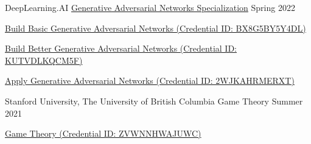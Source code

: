 

\begin{cventries}

  \cventry
    {DeepLearning.AI} %
    {\href{https://www.coursera.org/account/accomplishments/specialization/certificate/WT5VCNDDCB7V}{Generative Adversarial Networks Specialization}} %
    {} %
    {Spring 2022} %
    {
      \begin{cvitems} %
      	\item {\href{https://www.coursera.org/account/accomplishments/certificate/BX8G5BY5Y4DL}{Build Basic Generative Adversarial Networks (Credential ID: BX8G5BY5Y4DL)}}
      	\item {\href{https://www.coursera.org/account/accomplishments/certificate/KUTVDLKQCM5F}{Build Better Generative Adversarial Networks (Credential ID: KUTVDLKQCM5F)}}
      	\item {\href{https://www.coursera.org/account/accomplishments/certificate/2WJKAHRMERXT}{Apply Generative Adversarial Networks (Credential ID: 2WJKAHRMERXT)}}
      \end{cvitems}
    }

  \cventry
    {Stanford University, The University of British Columbia} %
    {Game Theory} %
    {} %
    {Summer 2021} %
    {
      \begin{cvitems} %
      	\item {\href{https://www.coursera.org/account/accomplishments/certificate/ZVWNNHWAJUWC}{Game Theory (Credential ID: ZVWNNHWAJUWC)}}
      \end{cvitems}
    }


\end{cventries}
